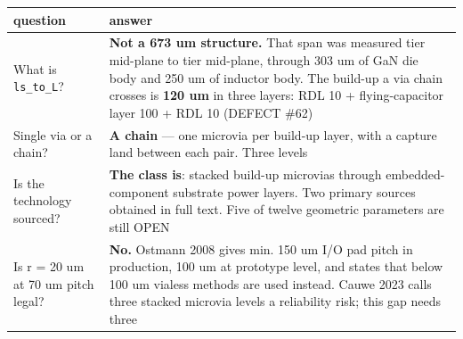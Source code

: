 \documentclass[10pt,]{article}
\begin{document}
\begin{longtable}[]{@{}ll@{}}
\toprule
\begin{minipage}[b]{0.47\columnwidth}\raggedright
question\strut
\end{minipage} & \begin{minipage}[b]{0.47\columnwidth}\raggedright
answer\strut
\end{minipage}\tabularnewline
\midrule
\endhead
\begin{minipage}[t]{0.47\columnwidth}\raggedright
What is \texttt{ls\_to\_L}?\strut
\end{minipage} & \begin{minipage}[t]{0.47\columnwidth}\raggedright
\textbf{Not a 673 um structure.} That span was measured tier mid-plane
to tier mid-plane, through 303 um of GaN die body and 250 um of inductor
body. The build-up a via chain crosses is \textbf{120 um} in three
layers: RDL 10 + flying-capacitor layer 100 + RDL 10 (DEFECT \#62)\strut
\end{minipage}\tabularnewline
\begin{minipage}[t]{0.47\columnwidth}\raggedright
Single via or a chain?\strut
\end{minipage} & \begin{minipage}[t]{0.47\columnwidth}\raggedright
\textbf{A chain} --- one microvia per build-up layer, with a capture
land between each pair. Three levels\strut
\end{minipage}\tabularnewline
\begin{minipage}[t]{0.47\columnwidth}\raggedright
Is the technology sourced?\strut
\end{minipage} & \begin{minipage}[t]{0.47\columnwidth}\raggedright
\textbf{The class is}: stacked build-up microvias through
embedded-component substrate power layers. Two primary sources obtained
in full text. Five of twelve geometric parameters are still OPEN\strut
\end{minipage}\tabularnewline
\begin{minipage}[t]{0.47\columnwidth}\raggedright
Is r = 20 um at 70 um pitch legal?\strut
\end{minipage} & \begin{minipage}[t]{0.47\columnwidth}\raggedright
\textbf{No.} Ostmann 2008 gives min. 150 um I/O pad pitch in production,
100 um at prototype level, and states that below 100 um vialess methods
are used instead. Cauwe 2023 calls three stacked microvia levels a
reliability risk; this gap needs three\strut
\end{minipage}\tabularnewline

\end{longtable}
\end{document}
